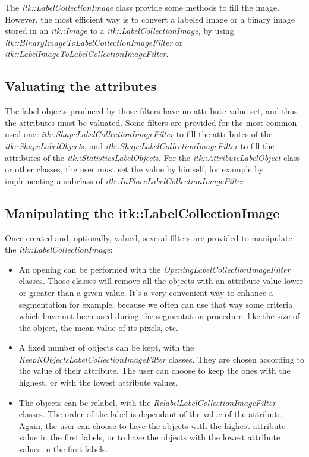\documentclass{InsightArticle}
\begin{document}
The {\em itk::LabelCollectionImage} class provide some methods to fill the image. However, the most efficient way is to convert a labeled image or a binary image stored in an {\em itk::Image} to a {\em itk::LabelCollectionImage}, by using {\em itk::BinaryImageToLabelCollectionImageFilter} or {\em itk::LabelImageToLabelCollectionImageFilter}.

\subsection{Valuating the attributes}

The label objects produced by those filters have no attribute value set, and thus the attributes must be valuated. Some filters are provided for the most common used one: {\em itk::ShapeLabelCollectionImageFilter} to fill the attributes of the {\em itk::ShapeLabelObject}s, and {\em itk::ShapeLabelCollectionImageFilter} to fill the attributes of the {\em itk::StatisticsLabelObject}s. For the {\em itk::AttributeLabelObject} class or other classes, the user must set the value by himself, for example by implementing a subclass of {\em itk::InPlaceLabelCollectionImageFilter}.

\subsection{Manipulating the itk::LabelCollectionImage}

Once created and, optionally, valued, several filters are provided to manipulate the {\em itk::LabelCollectionImage}:

\begin{itemize}
  \item An opening can be performed with the {\em OpeningLabelCollectionImageFilter} classes. Those classes will remove all the objects with an attribute value lower or greater than a given value. It's a very convenient way to enhance a segmentation for example, because we often can use that way some criteria  which have not been used during the segmentation procedure, like the size of the object, the mean value of its pixels, etc.
  \item A fixed number of objects can be kept, with the {\em KeepNObjectsLabelCollectionImageFilter} classes. They are chosen according to the value of their attribute. The user can choose to keep the ones with the highest, or with the lowest attribute values.
  \item The objects can be relabel, with the {\em RelabelLabelCollectionImageFilter} classes. The order of the label is dependant of the value of the attribute. Again, the user can choose to have the objects with the highest attribute value in the first labels, or to have the objects with the lowest attribute values in the first labels.
\end{itemize}
\end{document}
